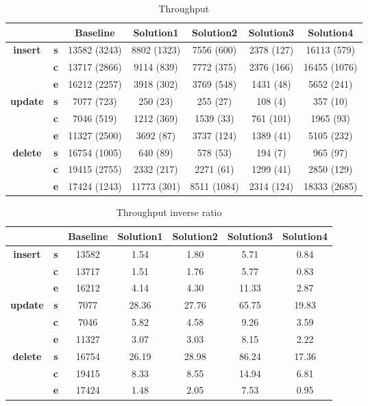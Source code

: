 \begin{table}[h]
\centering
\caption{Throughput}\label{t:}
\begin{tabular}{ccccccc}
\toprule
&&\textbf{Baseline} & \textbf{Solution1} & \textbf{Solution2} & \textbf{Solution3} & \textbf{Solution4}\\
\midrule
\multirow{3}{*}{\textbf{insert}} & \textbf{s} & 13582 (3243) & 8802 (1323) & 7556 (600) & 2378 (127) & 16113 (579)\\
 & \textbf{c} & 13717 (2866) & 9114 (839) & 7772 (375) & 2376 (166) & 16455 (1076)\\
 & \textbf{e} & 16212 (2257) & 3918 (302) & 3769 (548) & 1431 (48) & 5652 (241)\\
\midrule
\multirow{3}{*}{\textbf{update}} & \textbf{s} & 7077 (723) & 250 (23) & 255 (27) & 108 (4) & 357 (10)\\
 & \textbf{c} & 7046 (519) & 1212 (369) & 1539 (33) & 761 (101) & 1965 (93)\\
 & \textbf{e} & 11327 (2500) & 3692 (87) & 3737 (124) & 1389 (41) & 5105 (232)\\
\midrule
\multirow{3}{*}{\textbf{delete}} & \textbf{s} & 16754 (1005) & 640 (89) & 578 (53) & 194 (7) & 965 (97)\\
 & \textbf{c} & 19415 (2755) & 2332 (217) & 2271 (61) & 1299 (41) & 2850 (129)\\
 & \textbf{e} & 17424 (1243) & 11773 (301) & 8511 (1084) & 2314 (124) & 18333 (2685)\\
\bottomrule
\end{tabular}
\end{table}



\begin{table}[h]
\centering
\caption{Throughput inverse ratio}\label{t:}
\begin{tabular}{ccccccc}
\toprule
&&\textbf{Baseline} & \textbf{Solution1} & \textbf{Solution2} & \textbf{Solution3} & \textbf{Solution4}\\
\midrule
\multirow{3}{*}{\textbf{insert}} & \textbf{s} & 13582 & 1.54 & 1.80 & 5.71 & 0.84\\
 & \textbf{c} & 13717 & 1.51 & 1.76 & 5.77 & 0.83\\
 & \textbf{e} & 16212 & 4.14 & 4.30 & 11.33 & 2.87\\
\midrule
\multirow{3}{*}{\textbf{update}} & \textbf{s} & 7077 & 28.36 & 27.76 & 65.75 & 19.83\\
 & \textbf{c} & 7046 & 5.82 & 4.58 & 9.26 & 3.59\\
 & \textbf{e} & 11327 & 3.07 & 3.03 & 8.15 & 2.22\\
\midrule
\multirow{3}{*}{\textbf{delete}} & \textbf{s} & 16754 & 26.19 & 28.98 & 86.24 & 17.36\\
 & \textbf{c} & 19415 & 8.33 & 8.55 & 14.94 & 6.81\\
 & \textbf{e} & 17424 & 1.48 & 2.05 & 7.53 & 0.95\\
\bottomrule
\end{tabular}
\end{table}






